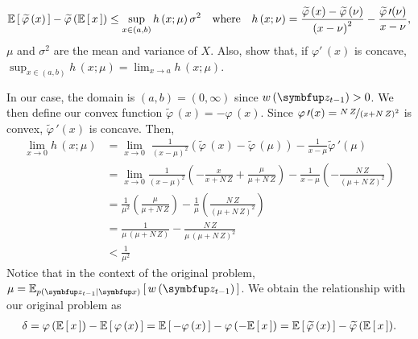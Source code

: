 \begin{proofEnd}
  \begin{align}
    \mathbb{E}\left[\,\widetilde{\varphi}\,(x)\,\right] - \widetilde{\varphi}\,(\mathbb{E}\left[\,x\,\right])
    \leq
    \sup_{x \in (a,b)} h\,(x; \mu) \, \sigma^2
    \quad \text{where}\quad h\,(x; \nu) = \frac{\widetilde{\varphi}\,(x) - \widetilde{\varphi}\,(\nu)}{{(x - \nu)}^2} - \frac{ \widetilde{\varphi}\,\prime(\nu) }{ x - \nu },\label{eq:jensen_gap_bound}
  \end{align}
\(\mu\) and \(\sigma^2\) are the mean and variance of \(X\).
Also, \citet[Lemma 1]{liao_sharpening_2019} show that, if \(\varphi\prime\,(x)\) is concave,  \(\sup_{x \in (a,b)} h\,(x; \mu) = \lim_{x \rightarrow a} h\,(x; \mu) \). 

In our case, the domain is \((a,b) = (0, \infty)\) since \(w\,(\vz_{t-1}) > 0\).
We then define our convex function \(\widetilde{\varphi}\,(x) = - \varphi\,(x)\).
Since \(\varphi\,\prime(x) = \nicefrac{N\,Z}{{(x + N\,Z)}^2}\) is convex, \(\widetilde{\varphi}\,\prime(x)\) is concave. Then, 
\begin{align}
  \lim_{x \rightarrow 0} h\,(x; \mu)
  &=
  \lim_{x \rightarrow 0} \; \frac{1}{{(x - \mu)}^2} \left( \widetilde{\varphi}\,(x) - \widetilde{\varphi}\,(\mu) \right)
  - \frac{1}{ x - \mu }  \widetilde{\varphi}\,\prime(\mu)  \\
  &=
  \lim_{x \rightarrow 0} \frac{1}{{(x - \mu)}^2}
  \left(
  - \frac{x}{x + N\,Z} + \frac{\mu}{\mu + N\,Z}
  \right)
  -
  \frac{1}{x - \mu}
  \left(
  - \frac{N\,Z}{ {(\mu + N\,Z)}^2 }
  \right) \\
  &= \frac{1}{\mu^2} \left( \frac{\mu}{\mu + N\,Z} \right)
  - \frac{1}{\mu} \left( \frac{N\,Z}{{(\mu + N\,Z)}^2} \right) \\
  &= \frac{1}{ \mu \, (\mu + N\,Z) }
  - \frac{N\,Z}{ \mu \, {(\mu + N\,Z)}^2} \\
  &< \frac{1}{\mu^2}
\end{align}
Notice that in the context of the original problem, \(\mu = \Esub{p(\vz_{t-1}\mid\vx)}{ w\,(\vz_{t-1}) }\).
We obtain the relationship with our original problem as
\begin{align}
  \delta
  = \varphi\,(\mathbb{E}\left[\,x\,\right]) - \mathbb{E}\left[\,\varphi\,(x)\,\right]
  = \mathbb{E}\left[\,-\varphi\,(x)\,\right] - \varphi\,(-\mathbb{E}\left[\,x\,\right])
  = \mathbb{E}\left[\,\widetilde{\varphi}\,(x)\,\right] - \widetilde{\varphi}\,(\mathbb{E}\left[\,x\,\right]).
\end{align}


\end{proofEnd}
